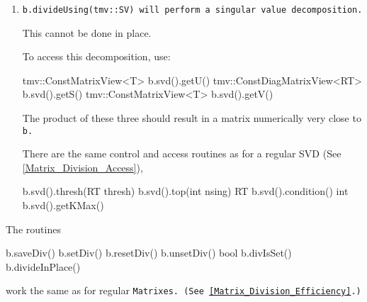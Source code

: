 \begin{enumerate}
The same kind of convolutions need to be done to perform this in place as 
for the LU decomposition.

To access this decomposition, use:\footnote{
I have not yet made a version of the \tt{PackedQ} class for \tt{BandMatrix}.
So unfortunately, here \tt{getQ()} creates the matrix directly and is thus
rather inefficient.}
\begin{tmvcode}
bool b.qrd().IsTrans()
tmv::Matrix<T> b.qrd().getQ()
tmv::ConstBandMatrixView<T> b.qrd().getR()
\end{tmvcode}
The following should result in a matrix numerically very close to \tt{b}.
\begin{tmvcode}
tmv::Matrix<T> m2(b.nrows,b.ncols);
tmv::MatrixView<T> m2v = 
      b.qrd().IsTrans() ? b2.transpose() : b2.view();
m2v = b.qrd().getQ() * b.qrd().getR();
\end{tmvcode}

\item
\tt{b.divideUsing(tmv::SV)} will perform a singular value decomposition.

This cannot be done in place.

To access this decomposition, use:
\begin{tmvcode}
tmv::ConstMatrixView<T> b.svd().getU()
tmv::ConstDiagMatrixView<RT> b.svd().getS()
tmv::ConstMatrixView<T> b.svd().getV()
\end{tmvcode}
The product of these three
should result in a matrix numerically very close to \tt{b}.

There are the same control and access routines as for a regular SVD
(See \ref{Matrix_Division_Access}),
\begin{tmvcode}
b.svd().thresh(RT thresh)
b.svd().top(int nsing)
RT b.svd().condition()
int b.svd().getKMax()
\end{tmvcode}

\end{enumerate}
The routines 
\begin{tmvcode}
b.saveDiv()
b.setDiv()
b.resetDiv()
b.unsetDiv()
bool b.divIsSet()
b.divideInPlace()
\end{tmvcode}
work the same as for regular \tt{Matrix}es.
(See \ref{Matrix_Division_Efficiency}.)

